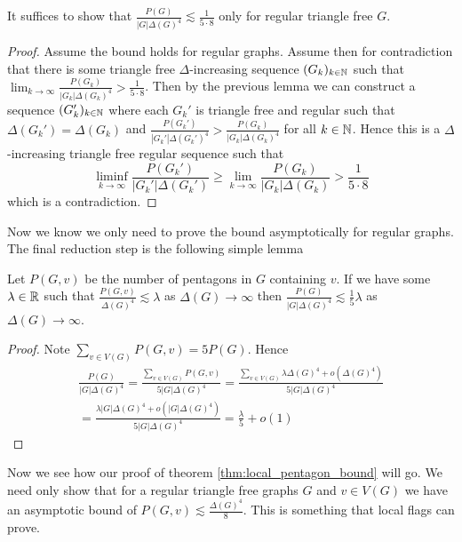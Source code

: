 \begin{corollary}
    \label{corollary:pentagon_regular_suffices}
    It suffices to show that $\frac{P(G)}{|G|\Delta(G)^4} \lesssim \frac{1}{5\cdot 8}$
    only for regular triangle free $G$.
\end{corollary}

\begin{proof}
    Assume the bound holds for regular graphs.
    Assume then for contradiction that
    there is some triangle free $\Delta$-increasing sequence $(G_k)_{k\in\mathbb{N}}$
    such that $\lim_{k\to\infty} \frac{P(G_k)}{|G_k|\Delta(G_k)^4} > \frac{1}{5\cdot 8}$.
    Then by the previous lemma we can construct a sequence
    $(G_k')_{k\in\mathbb{N}}$ where each $G_k'$ is triangle free and regular
    such that $\Delta(G_k')=\Delta(G_k)$ and
    $\frac{P(G_k')}{|G_k'|\Delta(G_k')^4} >\frac{P(G_k)}{|G_k|\Delta(G_k)^4}$
    for all $k\in\mathbb{N}$. Hence this is a $\Delta$-increasing triangle free regular
    sequence such that
    \[
        \liminf_{k\to\infty} \frac{P(G_k')}{|G_k'|\Delta(G_k')}
        \geq
        \lim_{k\to\infty} \frac{P(G_k)}{|G_k|\Delta(G_k)}
        > \frac{1}{5\cdot 8}
    \]
    which is a contradiction.
\end{proof}

Now we know we only need to prove the bound asymptotically for regular graphs.
The final reduction step is the following simple lemma
\begin{lemma}
    \label{lemma:pentagon_local_count}
    Let $P(G, v)$ be the number of pentagons in $G$ containing $v$. If we have some
    $\lambda \in \mathbb{R}$ such that
    $\frac{P(G, v)}{\Delta(G)^4} \lesssim \lambda$ as $\Delta(G)\to\infty$
    then
    $\frac{P(G)}{|G|\Delta(G)^4} \lesssim \frac{1}{5}\lambda$ as $\Delta(G)\to\infty$.
\end{lemma}

\begin{proof}
    Note $\sum_{v\in V(G)}P(G, v) = 5P(G)$. Hence
    \begin{multline*}
        \frac{P(G)}{|G|\Delta(G)^4}
        = \frac{\sum_{v\in V(G)} P(G, v)}{5|G|\Delta(G)^4}
        = \frac{\sum_{v \in V(G)} \lambda\Delta(G)^4 + o(\Delta(G)^4)}{5|G|\Delta(G)^4}\\
        = \frac{\lambda|G|\Delta(G)^4 + o(|G|\Delta(G)^4)}{5|G|\Delta(G)^4}
        = \frac{\lambda}{5} + o(1)
    \end{multline*}
\end{proof}

Now we see how our proof of theorem \ref{thm:local_pentagon_bound} will go.
We need only show that for a regular triangle free graphs $G$ and
$v\in V(G)$ we have an asymptotic bound of $P(G, v) \lesssim \frac{\Delta(G)^4}{8}$.
This is something that local flags can prove.

